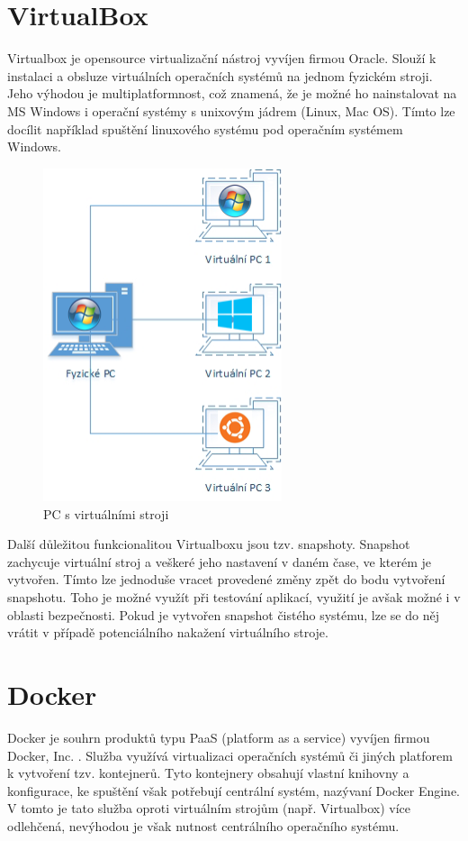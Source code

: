 \documentclass[thesis=M,czech,hidelinks]{FITthesis}[2013/05/06]
\begin{document}
\section{VirtualBox}\label{sec:virtualbox}
Virtualbox je opensource virtualizační nástroj vyvíjen firmou Oracle. Slouží k instalaci  a obsluze virtuálních operačních systémů na jednom fyzickém stroji. Jeho výhodou je multiplatformnost, což znamená, že je možné ho nainstalovat na MS Windows i operační systémy s unixovým jádrem (Linux, Mac OS). Tímto lze docílit například spuštění linuxového systému pod operačním systémem Windows.\cite{virutalbox}
\begin{figure}[h]
	\centering
	\includegraphics[width=7cm]{pictures/vbox.png}
	\caption{PC s virtuálními stroji \cite{vbox_pic}}
	\label{fig:vbox}
\end{figure}

Další důležitou funkcionalitou Virtualboxu jsou tzv. snapshoty. Snapshot zachycuje virtuální stroj a veškeré jeho nastavení v daném čase, ve kterém je vytvořen. Tímto lze jednoduše vracet provedené změny zpět do bodu vytvoření snapshotu. Toho je možné využít při testování aplikací, využití je avšak možné i v oblasti bezpečnosti. Pokud je vytvořen snapshot čistého systému, lze se do něj vrátit v případě potenciálního nakažení virtuálního stroje.


\section{Docker}\label{sec:docker}
Docker je souhrn produktů typu PaaS (platform as a service) vyvíjen firmou Docker, Inc. \cite{docker}. Služba využívá virtualizaci operačních systémů či jiných platforem k vytvoření tzv. kontejnerů. Tyto kontejnery obsahují vlastní knihovny a konfigurace, ke spuštění však potřebují centrální systém, nazývaní Docker Engine. V tomto je tato služba oproti virtuálním strojům (např. Virtualbox) více odlehčená, nevýhodou je však nutnost centrálního operačního systému. 
\end{document}
